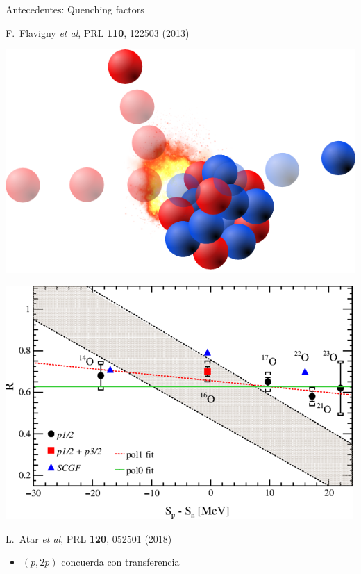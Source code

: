 \documentclass{beamer}
\begin{document}
\begin{frame}{Antecedentes: Quenching factors}
\begin{minipage}{0.45\textwidth}
\begin{center}
        \tiny F.~Flavigny \textit{et al}, PRL \textbf{110}, 122503 (2013)
    \end{center}
    \end{minipage}

    \begin{minipage}{0.45\textwidth}
    \includegraphics[height=0.3\textheight]{portada.png}
    \end{minipage}
    \begin{minipage}{0.45\textwidth}
    \begin{center}
    \includegraphics[height=0.3\textheight]{atar.png}
   
        \tiny L.~Atar \textit{et al}, PRL \textbf{120}, 052501 (2018)
    \end{center}
    \end{minipage}


\begin{itemize}
\item $(p,2p)$ concuerda con transferencia
\end{itemize}
    
\end{frame}
\end{document}
